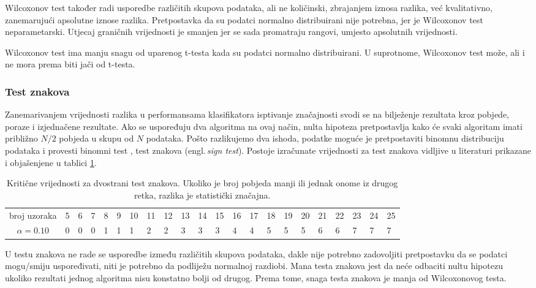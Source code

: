Wilcoxonov test također radi usporedbe različitih skupova podataka, ali ne količinski, zbrajanjem iznosa razlika, već kvalitativno, zanemarujući apsolutne iznose razlika. Pretpostavka da su podatci normalno distribuirani nije potrebna, jer je Wilcoxonov test neparametarski. Utjecaj graničnih vrijednosti je smanjen jer se sada promatraju rangovi, umjesto apsolutnih vrijednosti. 

Wilcoxonov test ima manju snagu od uparenog t-testa kada su podatci normalno distribuirani. U suprotnome, Wilcoxonov test može, ali i ne mora prema \citep{demvsar2006statistical} biti jači od t-testa.

\subsubsection{Test znakova}

Zanemarivanjem vrijednosti razlika u performansama klasifikatora isptivanje značajnosti svodi se na bilježenje rezultata kroz pobjede, poraze i izjednačene rezultate. Ako se uspoređuju dva algoritma na ovaj način, nulta hipoteza pretpostavlja kako će svaki algoritam imati približno $N/2$ pobjeda u skupu od $N$ podataka. Pošto razlikujemo dva ishoda, podatke moguće je pretpostaviti binomnu distribuciju podataka \citep{miller1965probability} i provesti binomni test \citep{dixon1946statistical}, test znakova (engl.\,\textit{sign test}). Postoje izračunate vrijednosti za test znakova vidljive u literaturi \citep{wilcoxon1973critical} prikazane i objašenjene u tablici \ref{tab:crit_val_twotailed_sign}.

\begin{table}
\begin{tabularx}{\textwidth}{c| XXXXXXXXXXXXXXXXXXXXX}
\hline
broj uzoraka & 5&6&7&8&9&10&11&12 & 13&14&15&16&17&18&19&20&21&22&23&24&25 \\
$\alpha = 0.10$ & 0&0&0&1&1&1&2&2&3&3&3&4&4&5&5&5&6&6&7&7&7 \\
\hline
\end{tabularx}
\caption{Kritične vrijednosti za dvostrani test znakova. Ukoliko je broj pobjeda manji ili jednak onome iz drugog retka, razlika je statistički značajna.}
\label{tab:crit_val_twotailed_sign}
\end{table}

U testu znakova ne rade se usporedbe između različitih skupova podataka, dakle nije potrebno zadovoljiti pretpostavku da se podatci mogu/smiju uspoređivati, niti je potrebno da podliježu normalnoj razdiobi. Mana testa znakova jest da neće odbaciti nultu hipotezu ukoliko rezultati jednog algoritma nisu konstatno bolji od drugog. Prema tome, snaga testa znakova je manja od Wilcoxonovog testa.


